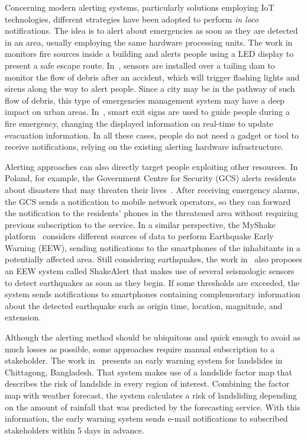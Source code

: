 \begin{refsection}
Concerning modern alerting systems, particularly solutions employing IoT technologies, different strategies have been adopted to perform \textit{in loco} notifications. The idea is to alert about emergencies as soon as they are detected in an area, usually employing the same hardware processing units. The work in~\cite{iotFire3} monitors fire sources inside a building and alerts people using a LED display to present a safe escape route. In~\cite{alertdam1}, sensors are installed over a tailing dam to monitor the flow of debris after an accident, which will trigger flashing lights and sirens along the way to alert people. Since a city may be in the pathway of such flow of debris, this type of emergencies management system may have a deep impact on urban areas. In~\cite{iotFire5}, smart exit signs are used to guide people during a fire emergency, changing the displayed information on real-time to update evacuation information. In all these cases, people do not need a gadget or tool to receive notifications, relying on the existing alerting hardware infrastructure. 

Alerting approaches can also directly target people exploiting other resources. In Poland, for example, the Government Centre for Security (GCS) alerts residents about disasters that may threaten their lives~\cite{notification2}. After receiving emergency alarms, the GCS sends a notification to mobile network operators, so they can forward the notification to the residents' phones in the threatened area without requiring previous subscription to the service. In a similar perspective, the MyShake platform~\cite{iotEarthquake4} considers different sources of data to perform Earthquake Early Warning (EEW), sending notifications to the smartphones of the inhabitants in a potentially affected area. Still considering earthquakes, the work in~\cite{notification1} also proposes an EEW system called ShakeAlert that makes use of several seismologic sensors to detect earthquakes as soon as they begin. If some thresholds are exceeded, the system sends notifications to smartphones containing complementary information about the detected earthquake such as origin time, location, magnitude, and extension. 

Although the alerting method should be ubiquitous and quick enough to avoid as much losses as possible, some approaches require manual subscription to a stakeholder. The work in~\cite{notification3} presents an early warning system for landslides in Chittagong, Bangladesh. That system makes use of a landslide factor map that describes the risk of landslide in every region of interest. Combining the factor map with weather forecast, the system calculates a risk of landsliding depending on the amount of rainfall that was predicted by the forecasting service. With this information, the early warning system sends e-mail notifications to subscribed stakeholders within 5 days in advance.


\end{refsection}
